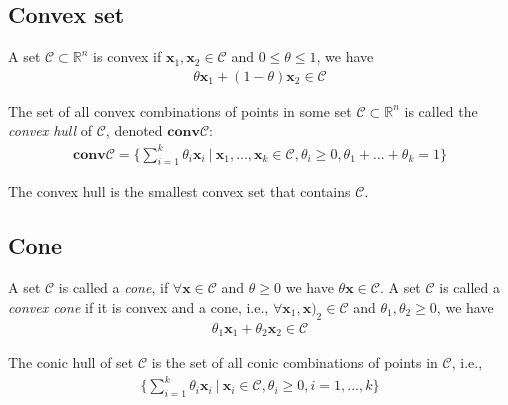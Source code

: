 \subsection{Convex set}
\begin{definition}
    A set $\mathcal{C} \subset \mathbb{R}^n$ is convex
    if $\mathbf{x}_1, \mathbf{x}_2 \in \mathcal{C}$
    and $0 \leq \theta \leq 1$, we have
    \begin{align}
        \theta \mathbf{x}_1 + 
        (1 - \theta)\mathbf{x}_2
        \in \mathcal{C}
    \end{align}
\end{definition}
\begin{definition}
    The set of all convex combinations of points
    in some set $\mathcal{C} \subset \mathbb{R}^n$
    is called the \emph{convex hull} of $\mathcal{C}$,
    denoted $\mathbf{conv}\mathcal{C}$:
    \begin{align}
        \mathbf{conv}\mathcal{C} = \{
            \sum_{i=1}^k \theta_i \mathbf{x}_i \ | \ 
            \mathbf{x}_1,...,\mathbf{x}_k \in \mathcal{C},
            \theta_i \geq 0,
            \theta_1 + ... + \theta_k = 1\}
    \end{align}
\end{definition}
\begin{remark}
    The convex hull is the smallest convex set
    that contains $\mathcal{C}$.
\end{remark}

\subsection{Cone}
\begin{definition}[Cone]
    A set $\mathcal{C}$ is called a \emph{cone},
    if $\forall \mathbf{x} \in \mathcal{C}$ and
    $\theta \geq 0$ we have $\theta \mathbf{x} \in \mathcal{C}$.
    A set $\mathcal{C}$ is called a \emph{convex cone}
    if it is convex and a cone, i.e.,
    $\forall \mathbf{x}_1, \mathbf{x})_2 \in \mathcal{C}$
    and $\theta_1, \theta_2 \geq 0$, we have
    \begin{align}
        \theta_1 \mathbf{x}_1 + \theta_2 \mathbf{x}_2
        \in \mathcal{C}
    \end{align}
\end{definition}

\begin{definition}
    The conic hull of set $\mathcal{C}$ is the
    set of all conic combinations of points in
    $\mathcal{C}$, i.e.,
    \begin{align}
        \{ \sum_{i=1}^k \theta_i \mathbf{x}_i \ | \
        \mathbf{x}_i \in \mathcal{C}, \theta_i \geq 0,
        i = 1,...,k \}
    \end{align}
\end{definition}

